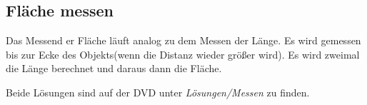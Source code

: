 \subsection{Fläche messen}
Das Messend er Fläche läuft analog zu dem Messen der Länge. Es wird gemessen bis zur Ecke des Objekts(wenn die Distanz wieder größer wird). Es wird zweimal die Länge berechnet und daraus dann die Fläche.

Beide Lösungen sind auf der DVD unter \textit{Lösungen/Messen} zu finden.